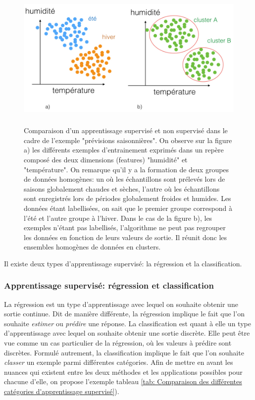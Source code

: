 \begin{figure}[H]
	\centering\includegraphics[height=7cm]{images/apprentissage_meteo.jpeg}
	\caption[Comparaison d'un apprentissage supervisé et non supervisé dans le cadre de l'exemple "prévisions saisonnières"]{Comparaison d'un apprentissage supervisé et non supervisé dans le cadre de l'exemple "prévisions saisonnières". On observe sur la figure a) les différents exemples d'entrainement exprimés dans un repère composé des deux dimensions (features) "humidité" et "température". On remarque qu'il y a la formation de deux groupes de données homogènes: un où les échantillons sont prélevés lors de saisons globalement chaudes et sèches, l'autre où les échantillons sont enregistrés lors de périodes globalement froides et humides. Les données étant labellisées, on sait que le premier groupe correspond à l'été et l'autre groupe à l'hiver. Dans le cas de la figure b), les exemples n'étant pas labellisés, l'algorithme ne peut pas regrouper les données en fonction de leurs valeurs de sortie. Il réunit donc les ensembles homogènes de données en clusters.}
	\label{fig:Comparaison d'un apprentissage supervisé et non supervisé dans le cadre de l'exemple prévision saisonnières}
\end{figure}

Il existe deux types d'apprentissage supervisé: la régression et la classification.


\subsubsection{Apprentissage supervisé: régression et classification} 
\label{Le Machine Learning: Généralités sur le Machine Learning: Le modèle:Regression et classification}
 La régression est un type d'apprentissage avec lequel on souhaite obtenir une sortie continue. Dit de manière différente, la régression implique le fait que l'on souhaite \emph{estimer} ou \emph{prédire} une réponse. La classification est quant à elle un type d'apprentissage avec lequel on souhaite obtenir une sortie discrète. Elle peut être vue comme un cas particulier de la régression, où les valeurs à prédire sont discrètes. Formulé autrement, la classification implique le fait que l'on souhaite \emph{classer} un exemple parmi différentes catégories. 
 \newline
 Afin de mettre en avant les nuances qui existent entre les deux méthodes et les applications possibles pour chacune d'elle, on propose l'exemple tableau \ref {tab: Comparaison des différentes catégories d'apprentissage supervisé}).

